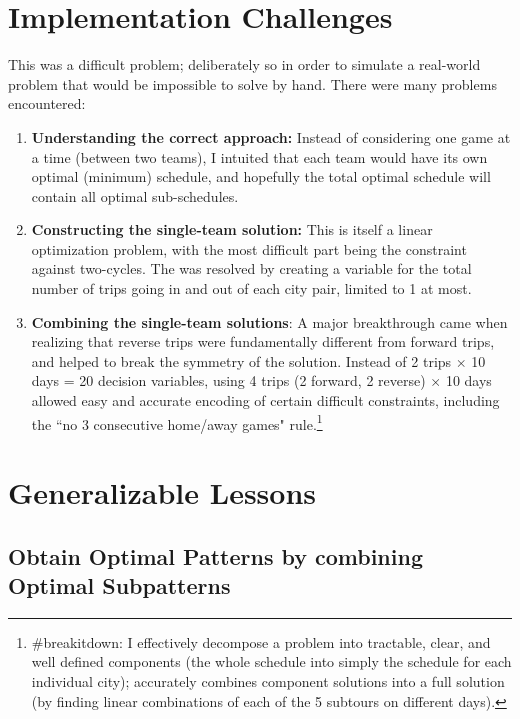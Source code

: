 \documentclass[twoside]{article}
\begin{document}
\section*{Implementation Challenges }
This was a difficult problem; deliberately so in order to simulate a real-world problem that would be impossible to solve by hand. There were many problems encountered:
\begin{enumerate}
\item \textbf{Understanding the correct approach:} Instead of considering one game at a time (between two teams), I intuited that each team would have its own optimal (minimum) schedule, and hopefully the total optimal schedule will contain all optimal sub-schedules.
\item \textbf{Constructing the single-team solution:} This is itself a linear optimization problem, with the most difficult part being the constraint against two-cycles. The was resolved by creating a variable for the total number of trips going in and out of each city pair, limited to 1 at most.
\item \textbf{Combining the single-team solutions}: A major breakthrough came when realizing that reverse trips were fundamentally different from forward trips, and helped to break the symmetry of the solution. Instead of 2 trips $\times$ 10 days  = 20  decision variables, using 4 trips (2 forward, 2 reverse) $\times$ 10 days allowed easy and accurate encoding of certain difficult constraints, including the ``no 3 consecutive home/away games" rule.\footnote{\#breakitdown: I effectively decompose a problem into tractable, clear, and well defined components (the whole schedule into simply the schedule for each individual city); accurately combines component solutions into a full solution (by finding linear combinations of each of the 5 subtours on different days).}

\end{enumerate}


\section*{Generalizable Lessons}
\subsection*{Obtain Optimal Patterns by combining Optimal Subpatterns}
\end{document}
